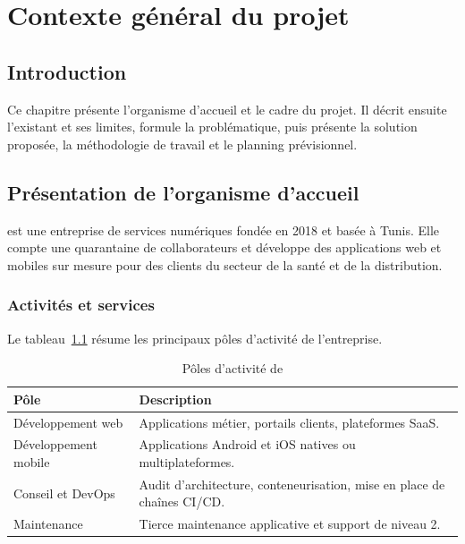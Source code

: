 \chapter{Contexte général du projet}\label{ch:contexte}

\section*{Introduction}
Ce chapitre présente l'organisme d'accueil et le cadre du projet. Il décrit ensuite l'existant et ses limites, formule la problématique, puis présente la solution proposée, la méthodologie de travail et le planning prévisionnel.

\section{Présentation de l'organisme d'accueil}
\entreprise{} est une entreprise de services numériques fondée en 2018 et basée à Tunis. Elle compte une quarantaine de collaborateurs et développe des applications web et mobiles sur mesure pour des clients du secteur de la santé et de la distribution. 

\subsection{Activités et services}
Le tableau~\ref{tab:services} résume les principaux pôles d'activité de l'entreprise.

\begin{table}[H]\centering
\caption{Pôles d'activité de \entreprise}\label{tab:services}
\begin{tabularx}{\linewidth}{lX}
\toprule
\textbf{Pôle} & \textbf{Description} \\
\midrule
Développement web & Applications métier, portails clients, plateformes SaaS. \\
Développement mobile & Applications Android et iOS natives ou multiplateformes. \\
Conseil et DevOps & Audit d'architecture, conteneurisation, mise en place de chaînes CI/CD. \\
Maintenance & Tierce maintenance applicative et support de niveau 2. \\
\bottomrule
\end{tabularx}
\end{table}

